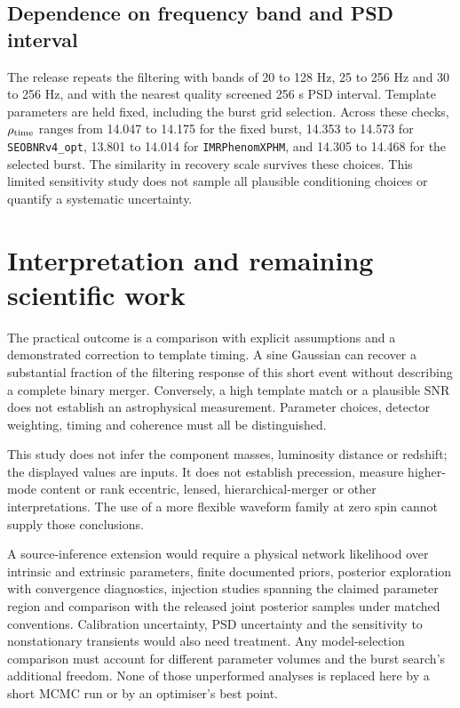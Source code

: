 \documentclass[11pt,a4paper]{article}
\begin{document}
\subsection{Dependence on frequency band and PSD interval}
The release repeats the filtering with bands of 20 to 128 Hz, 25 to 256 Hz and 30 to 256 Hz, and with the nearest quality screened 256 s PSD interval. Template parameters are held fixed, including the burst grid selection. Across these checks, $\rho_{\rm time}$ ranges from 14.047 to 14.175 for the fixed burst, 14.353 to 14.573 for \texttt{SEOBNRv4\_opt}, 13.801 to 14.014 for \texttt{IMRPhenomXPHM}, and 14.305 to 14.468 for the selected burst. The similarity in recovery scale survives these choices. This limited sensitivity study does not sample all plausible conditioning choices or quantify a systematic uncertainty.

\section{Interpretation and remaining scientific work}
The practical outcome is a comparison with explicit assumptions and a demonstrated correction to template timing. A sine Gaussian can recover a substantial fraction of the filtering response of this short event without describing a complete binary merger. Conversely, a high template match or a plausible SNR does not establish an astrophysical measurement. Parameter choices, detector weighting, timing and coherence must all be distinguished.

This study does not infer the component masses, luminosity distance or redshift; the displayed values are inputs. It does not establish precession, measure higher-mode content or rank eccentric, lensed, hierarchical-merger or other interpretations. The use of a more flexible waveform family at zero spin cannot supply those conclusions.

A source-inference extension would require a physical network likelihood over intrinsic and extrinsic parameters, finite documented priors, posterior exploration with convergence diagnostics, injection studies spanning the claimed parameter region and comparison with the released joint posterior samples under matched conventions. Calibration uncertainty, PSD uncertainty and the sensitivity to nonstationary transients would also need treatment. Any model-selection comparison must account for different parameter volumes and the burst search's additional freedom. None of those unperformed analyses is replaced here by a short MCMC run or by an optimiser's best point.
\end{document}

